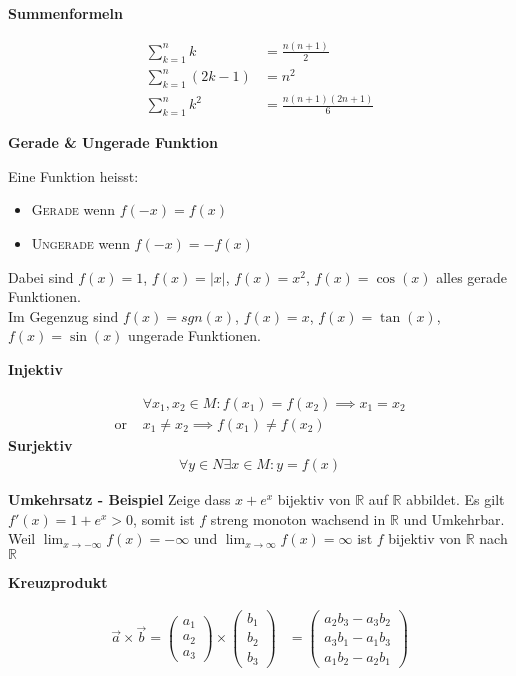\documentclass[25pt]{sciposter}
\newcommand{\R}{\mathbb{R}}
\newenvironment{method}[1]{\begin{mdframed}[backgroundcolor=blue!10,innertopmargin=15pt, innerbottommargin=15pt,nobreak=true]
		\textbf{#1 }
	}
	{ 
	\end{mdframed}
}
\begin{document}
\begin{multicols}{3}
\begin{method}{Summenformeln}
	\begin{align*}
	\sum _{{k=1}}^{n}k &= {\frac  {n(n+1)}{2}}\\
	\sum_{k=1}^n (2k-1) &= n^2\\
	\sum _{{k=1}}^{n}k^{2} &= {\frac  {n(n+1)(2n+1)}{6}}
	\end{align*}
\end{method}


\begin{method}{Gerade \& Ungerade Funktion}
	Eine Funktion heisst:
	\begin{itemize}
		\item \textsc{Gerade} wenn $f(-x) = f(x)$
		\item \textsc{Ungerade} wenn $f(-x) = - f(x)$
	\end{itemize}
	Dabei sind $f(x) = 1$, $f(x) = |x|$, $f(x)=x^2$, $f(x) = \cos(x)$ alles gerade Funktionen.\\
	Im Gegenzug sind $f(x) = sgn(x)$, $f(x) = x$, $f(x) = \tan(x)$, $f(x) = \sin(x)$ ungerade Funktionen.
\end{method}


\begin{method}{Injektiv}
	\begin{align*}
	&\forall x_1,x_2 \in M : f(x_1) = f(x_2) \implies x_1 = x_2\\
	\text{or }  &x_1 \not = x_2 \implies f(x_1) \not = f(x_2)
	\end{align*}
	\textbf{Surjektiv}
	\begin{align*}
	\forall y \in N \exists x \in M : y = f(x)
	\end{align*}
\end{method}

\textbf{Umkehrsatz - Beispiel} Zeige dass $x + e^x$ bijektiv von $\R$ auf $\R$ abbildet. Es gilt $f'(x) = 1 + e^x > 0$, somit ist $f$ streng monoton wachsend in $\R$ und Umkehrbar. Weil $\lim_{x \to -\infty} f(x) = - \infty$ und $\lim_{x \to \infty} f(x) = \infty$ ist $f$ bijektiv von $\R$ nach $\R$



\begin{method}{Kreuzprodukt}
	\begin{align*}
	\vec{a}\times\vec{b}=	\begin{pmatrix}a_1 \\ a_2 \\ a_3\end{pmatrix}
	\times
	\begin{pmatrix}b_1 \\ b_2 \\ b_3 \end{pmatrix} &=	\begin{pmatrix}
	a_2b_3 - a_3b_2 \\
	a_3b_1 - a_1b_3 \\
	a_1b_2 - a_2b_1
	\end{pmatrix}
	\end{align*}
\end{method}




\end{multicols}
\end{document}
